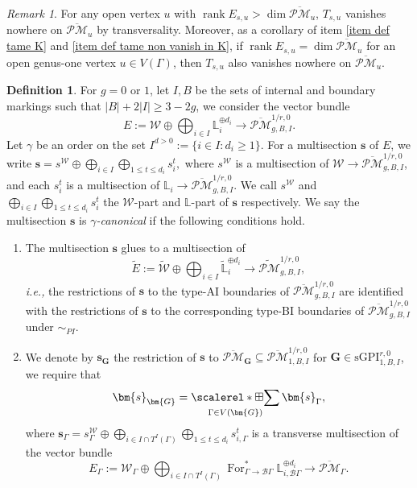 \documentclass[11pt]{amsart}
\theoremstyle{definition}
\newtheorem{dfn}[dummy]{Definition}
\theoremstyle{remark}
\newtheorem{rmk}[dummy]{Remark}
\newcommand{\oPMb}{{\overline{\mathcal{PM}}}}
\newcommand{\<}{\left<}
\renewcommand{\>}{\right>}
\numberwithin{equation}{section}
\DeclareMathOperator{\rk}{rank}
\def\sGPI{\text{sGPI}}
\DeclareMathOperator*{\bboxplus}{\scalerel*{\boxplus}{\sum}}
\begin{document}
\begin{rmk}\label{rmk on non vanish tame rk >= dim}
    For any open vertex $u$ with  $\rk  E_{s,u}> \dim \oPMb_u$,  $T_{s,u}$ vanishes nowhere on $\oPMb_u$ by transversality. Moreover, as a corollary of item \ref{item def tame K} and \ref{item def tame non vanish in K}, if $\rk  E_{s,u}= \dim \oPMb_u$ for an open genus-one vertex $u\in V(\Gamma)$, then $T_{s,u}$ also vanishes nowhere on $\oPMb_u$. 
\end{rmk}


\begin{dfn}\label{dfn canonical section}
 For $g=0$ or $1$, let $I,B$ be the sets of internal and boundary markings such that $\lvert B \rvert +2 \lvert I \rvert\ge 3-2g$, we consider the vector bundle
$$E:=\mathcal W\oplus \bigoplus_{i\in I} \mathbb L_i^{\oplus d_i}\to \oPMb^{1/r,0}_{g,B,I}.$$
Let $\gamma$ be an order on the set $I^{d>0}:=\{i\in I\colon d_i\ge 1\}$. 
For a multisection $\bm{s}$ of $E$,  we write $\bm{s}=s^{\mathcal W}\oplus\bigoplus_{i\in I}\bigoplus_{1\le t \le d_i}s_i^t,$ where $s^{\mathcal W}$ is a multisection of $\mathcal W\to \oPMb^{1/r,0}_{g,B,I}$, and each $s_i^t$ is a multisection of $\mathbb L_i\to \oPMb^{1/r,0}_{g,B,I}$.
     We call $s^{\mathcal W}$ and $\bigoplus_{i\in I}\bigoplus_{1\le t \le d_i}s_i^t$ the $\mathcal W$-part and $\mathbb L$-part of $\bm{s}$ respectively.
     We say the multisection $\bm{s}$ is \textit{$\gamma$-canonical} if the following conditions hold.
     \begin{enumerate}
         \item\label{item canonical glue} The multisection $\bm{s}$ glues to a multisection of 
         $$\widetilde{E}:=\widetilde{\mathcal W}\oplus \bigoplus_{i\in I} \widetilde{\mathbb L}_i^{\oplus d_i}\to \widetilde{\mathcal {PM}}^{1/r,0}_{g,B,I},$$
         \textit{i.e.,} the restrictions of $\bm{s}$ to the type-AI boundaries of $\oPMb^{1/r,0}_{g,B,I}$ are identified with the restrictions of $\bm{s}$ to the corresponding type-BI boundaries of $\oPMb^{1/r,0}_{g,B,I}$ under $\sim_{PI}$.
         \item\label{item canonical decompose} We denote by $\bm{s}_{\bm{G}}$ the restriction of $\bm{s}$ to $\oPMb_{\bm{G}}\subseteq  \oPMb^{1/r,0}_{1,B,I}$ for  $\bm{G}\in \sGPI^{r,0}_{1,B,I}$, we require that 
         \begin{equation}\label{eq canonical on each connected component}
            \bm{s}_{\bm{G}}=\bboxplus_{\Gamma\in V(\bm{G})} \bm{s}_{\Gamma},
         \end{equation}
         where $\bm{s}_{\Gamma}=s_{\Gamma}^{\mathcal W}  \oplus \bigoplus_{i\in I\cap T^I(\Gamma)}\bigoplus_{1\le t \le d_i}s_{i,\Gamma}^t$ is a transverse multisection of the vector bundle
         $$E_{\Gamma}:=\mathcal W_{\Gamma}\oplus \bigoplus_{i\in I\cap T^I(\Gamma)} \operatorname{For}^*_{\Gamma\to \mathcal B \Gamma}\mathbb L_{i,\mathcal B \Gamma}^{\oplus d_i}\to \oPMb_\Gamma.$$
       

\end{enumerate}
\end{dfn}
\end{document}
